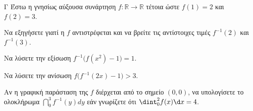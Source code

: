 \begin{thema}{Γ}
Έστω η γνησίως αύξουσα συνάρτηση $f: \mathbb{R} \to \mathbb{R}$ τέτοια ώστε $f(1) = 2$ και $f(2) = 3$. 
\begin{erwthma}
  \item Να εξηγήσετε γιατί η $f$ αντιστρέφεται και να βρείτε τις αντίστοιχες τιμές $f^{-1}(2)$ και $f^{-1}(3)$.
  \item Να λύσετε την εξίσωση $f^{-1}\big(f(x^2)-1\big) = 1$.
  \item Να λύσετε την ανίσωση $f\big(f^{-1}(2x) - 1\big) > 3$.
  \item Αν η γραφική παράσταση της $f$ διέρχεται από το σημείο $(0,0)$, να υπολογίσετε το ολοκλήρωμα $\dint_0^3 f^{-1}(y)dy$ εάν γνωρίζετε ότι $\dint_0^2 f(x)\d x = 4$.
\end{erwthma}
\end{thema}
